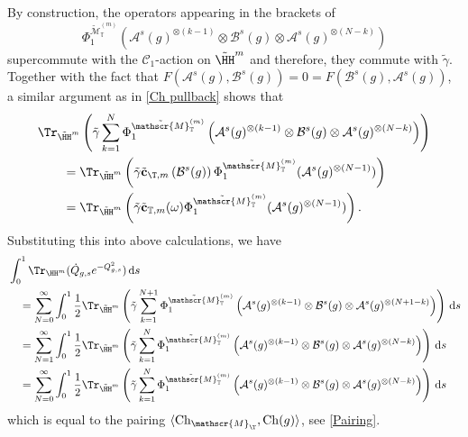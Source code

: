 \documentclass[a4paper, english, 12pt, bibliography=totocnumbered,
index=totoc]{scrartcl}
\begin{document}
By construction, the operators appearing in the brackets of
\begin{equation*}
	\Phi_1^{\tilde{\mathscr{M}}_{\mathbb{T}}^{(m)}}\left(
	\mathcal{A}^s(g)^{\otimes(k-1)} \otimes
	\mathcal{B}^s(g)
	\otimes \mathcal{A}^s(g)^{\otimes(N-k)}
	\right)
\end{equation*}
supercommute with the $\mathcal{C}_1$-action on $\tilde{\HH}^m$ and
therefore, they commute with $\tilde{\gamma}$.
Together with the fact that $F(\mathcal{A}^s(g), \mathcal{B}^s(g)) = 0 =
F(\mathcal{B}^s(g), \mathcal{A}^s(g))$, a similar argument as in
\cref{Ch pullback} shows that
\begin{align*}
	& \Tr_{\tilde{\HH}^m}\left(\tilde{\gamma}
	\sum_{k=1}^{N}\Phi_1^{\tilde{\mathscr{M}}_{\mathbb{T}}^{(m)}}\left(
	\mathcal{A}^s(g)^{\otimes(k-1)} \otimes
	\mathcal{B}^s(g)
	\otimes \mathcal{A}^s(g)^{\otimes(N-k)}
	\right)\right) \\
	& \qquad = \Tr_{\tilde{\HH}^m}\left(\tilde{\gamma} \tilde{\mathbf{c}}_{\T,
		m}\left(\mathcal{B}^s(g)\right)
	\Phi_1^{\tilde{\mathscr{M}}_{\mathbb{T}}^{(m)}}(\mathcal{A}^s(g)^{\otimes(N-1)})
	\right) \\
	& \qquad = \Tr_{\tilde{\HH}^m}\left(\tilde{\gamma}
	\tilde{\mathbf{c}}_{\mathbb{T}, m}(\omega)
	\Phi_1^{\tilde{\mathscr{M}}_{\mathbb{T}}^{(m)}}(\mathcal{A}^s(g)^{\otimes(N-1)})
	\right).
\end{align*}
Substituting this into above calculations, we have
\begin{align*}
	& \int_0^1 \Tr_{\HH^m}(\dot{Q}_{g,s} e^{-Q_{g,s}^2}) \, \mathrm{d}s \\
	& \quad = \sum_{N=0}^{\infty} \int_0^1 \frac 12
	\Tr_{\tilde{\HH}^m}\left(\tilde{\gamma}
	\sum_{k=1}^{N+1}\Phi_1^{\tilde{\mathscr{M}}_{\mathbb{T}}^{(m)}}\left(
	\mathcal{A}^s(g)^{\otimes(k-1)} \otimes
	\mathcal{B}^s(g)
	\otimes \mathcal{A}^s(g)^{\otimes(N+1-k)}
	\right)\right)\, \mathrm{d}s \\
	& \quad = \sum_{N=1}^{\infty} \int_0^1 \frac 12
	\Tr_{\tilde{\HH}^m}\left(\tilde{\gamma}
	\sum_{k=1}^{N}\Phi_1^{\tilde{\mathscr{M}}_{\mathbb{T}}^{(m)}}\left(
	\mathcal{A}^s(g)^{\otimes(k-1)} \otimes
	\mathcal{B}^s(g)
	\otimes \mathcal{A}^s(g)^{\otimes(N-k)}
	\right)\right)\, \mathrm{d}s \\
	& \quad = \sum_{N=0}^{\infty} \int_0^1 \frac 12
	\Tr_{\tilde{\HH}^m}\left(\tilde{\gamma}
	\sum_{k=1}^{N}\Phi_1^{\tilde{\mathscr{M}}_{\mathbb{T}}^{(m)}}\left(
	\mathcal{A}^s(g)^{\otimes(k-1)} \otimes
	\mathcal{B}^s(g)
	\otimes \mathcal{A}^s(g)^{\otimes(N-k)}
	\right)\right)\, \mathrm{d}s
\end{align*}
which is equal to the pairing $\langle
\mathrm{Ch}_{\mathscr{M}_\T}, \mathrm{Ch}(g)\rangle$, see
\cref{Pairing}.
\printbibliography
\end{document}
